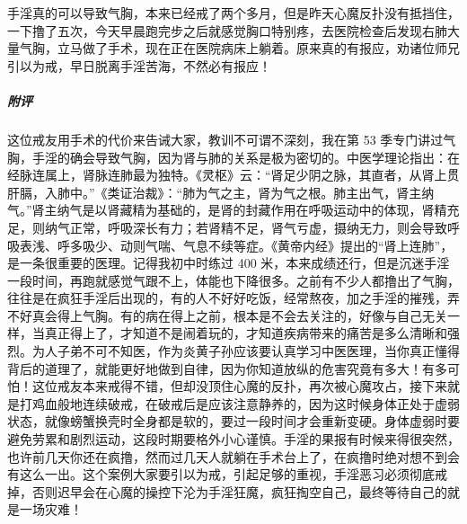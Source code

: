 \begin{case}
    手淫真的可以导致气胸，本来已经戒了两个多月，但是昨天心魔反扑没有抵挡住，一下撸了五次，今天早晨跑完步之后就感觉胸口特别疼，去医院检查后发现右肺大量气胸，立马做了手术，现在正在医院病床上躺着。原来真的有报应，劝诸位师兄引以为戒，早日脱离手淫苦海，不然必有报应！
    \subparagraph{附评} 这位戒友用手术的代价来告诫大家，教训不可谓不深刻，我在第 53 季专门讲过气胸，手淫的确会导致气胸，因为肾与肺的关系是极为密切的。中医学理论指出：在经脉连属上，肾脉连肺最为独特。《灵枢》云：“肾足少阴之脉，其直者，从肾上贯肝膈，入肺中。”《类证治裁》：“肺为气之主，肾为气之根。肺主出气，肾主纳气。”肾主纳气是以肾藏精为基础的，是肾的封藏作用在呼吸运动中的体现，肾精充足，则纳气正常，呼吸深长有力；若肾精不足，肾气亏虚，摄纳无力，则会导致呼吸表浅、呼多吸少、动则气喘、气息不续等症。《黄帝内经》提出的“肾上连肺”，是一条很重要的医理。记得我初中时练过 400 米，本来成绩还行，但是沉迷手淫一段时间，再跑就感觉气跟不上，体能也下降很多。之前有不少人都撸出了气胸，往往是在疯狂手淫后出现的，有的人不好好吃饭，经常熬夜，加之手淫的摧残，弄不好真会得上气胸。有的病在得上之前，根本是不会去关注的，好像与自己无关一样，当真正得上了，才知道不是闹着玩的，才知道疾病带来的痛苦是多么清晰和强烈。为人子弟不可不知医，作为炎黄子孙应该要认真学习中医医理，当你真正懂得背后的道理了，就能更好地做到自律，因为你知道放纵的危害究竟有多大！有多可怕！这位戒友本来戒得不错，但却没顶住心魔的反扑，再次被心魔攻占，接下来就是打鸡血般地连续破戒，在破戒后是应该注意静养的，因为这时候身体正处于虚弱状态，就像螃蟹换壳时全身都是软的，要过一段时间才会重新变硬。身体虚弱时要避免劳累和剧烈运动，这段时期要格外小心谨慎。手淫的果报有时候来得很突然，也许前几天你还在疯撸，然而过几天人就躺在手术台上了，在疯撸时绝对想不到会有这么一出。这个案例大家要引以为戒，引起足够的重视，手淫恶习必须彻底戒掉，否则迟早会在心魔的操控下沦为手淫狂魔，疯狂掏空自己，最终等待自己的就是一场灾难！
\end{case}

